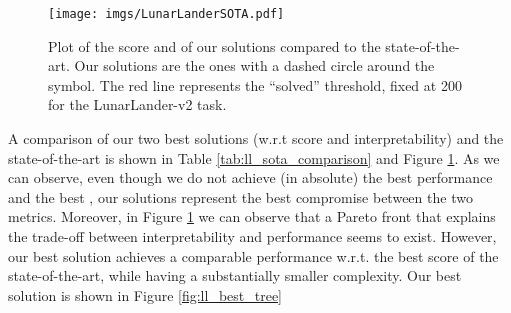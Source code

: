 \documentclass[review,english]{elsarticle}
\begin{document}
\begin{figure}
    \centering
    \texttt{[image: imgs/LunarLanderSOTA.pdf]}
    \caption{Plot of the score and  of our solutions compared to the state-of-the-art.
    Our solutions are the ones with a dashed circle around the symbol.
    The red line represents the ``solved'' threshold, fixed at 200 for the LunarLander-v2 task.
    }
    \label{fig:ll_sota_comparison}
\end{figure}

A comparison of our two best solutions (w.r.t score and interpretability) and the state-of-the-art is shown in Table \ref{tab:ll_sota_comparison} and Figure \ref{fig:ll_sota_comparison}.
As we can observe, even though we do not achieve (in absolute) the best performance and the best , our solutions represent the best compromise between the two metrics.
Moreover, in Figure \ref{fig:ll_sota_comparison} we can observe that a Pareto front that explains the trade-off between interpretability and performance seems to exist. 
However, our best solution achieves a comparable performance w.r.t. the best score of the state-of-the-art, while having a substantially smaller complexity.
Our best solution is shown in Figure \ref{fig:ll_best_tree}

\newpage
\end{document}
